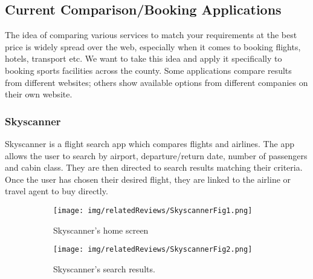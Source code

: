 \subsection{Current Comparison/Booking Applications}
\label{sub:current_comparison_applications}

The idea of comparing various services to match your requirements at the best
price is widely spread over the web, especially when it comes to booking
flights, hotels, transport etc.  We want to take this idea and apply it
specifically to booking sports facilities across the county.  Some applications
compare results from different websites; others show available options from
different companies on their own website.

\subsubsection{Skyscanner}
\label{ssub:skyscanner}

Skyscanner is a flight search app which compares flights and airlines. The app
allows the user to search by airport, departure/return date, number of
passengers and cabin class. They are then directed to search results matching
their criteria. Once the user has chosen their desired flight, they are linked
to the airline or travel agent to buy directly.
\begin{figure}[ht]
	\centering
	\begin{subfigure}[b]{0.2\textwidth}
		\texttt{[image: img/relatedReviews/SkyscannerFig1.png]}
		\caption{Skyscanner's home screen}\label{fig:skyscannerfig1}
	\end{subfigure}%
	\qquad
	\begin{subfigure}[b]{0.2\textwidth}
		\texttt{[image: img/relatedReviews/SkyscannerFig2.png]}
		\caption{Skyscanner's search results.}
	\end{subfigure}
	\caption{}\label{fig:skyscanner1}
\end{figure}

